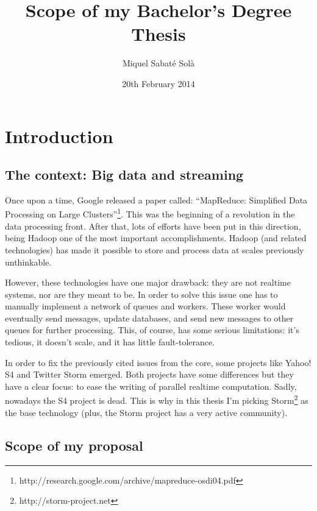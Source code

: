 \documentclass[a4paper,12pt]{article}
\begin{document}
\title{Scope of my Bachelor's Degree Thesis}
\author{Miquel Sabaté Solà}
\date{20th February 2014}
\maketitle

\setcounter{page}{1}

\vspace{-1.0cm}

\section*{Introduction}

\subsection*{The context: Big data and streaming}

Once upon a time, Google released a paper called:
``MapReduce: Simplified Data Processing on Large
Clusters''\footnote{http://research.google.com/archive/mapreduce-osdi04.pdf}.
This was the beginning of a revolution in the data processing front. After
that, lots of efforts have been put in this direction, being Hadoop one of the
most important accomplishments. Hadoop (and related technologies) has made it
possible to store and process data at scales previously unthinkable.

However, these technologies have one major drawback: they are not realtime
systems, nor are they meant to be. In order to solve this issue one has to
manually implement a network of queues and workers. These worker would
eventually send messages, update databases, and send new messages to other
queues for further processing. This, of course, has some serious limitations:
it's tedious, it doesn't scale, and it has little fault-tolerance.

In order to fix the previously cited issues from the core, some projects like
Yahoo! S4 and Twitter Storm emerged. Both projects have some differences but
they have a clear focus: to ease the writing of parallel realtime computation.
Sadly, nowadays the S4 project is dead. This is why in this thesis I'm picking
Storm\footnote{http://storm-project.net} as the base technology (plus, the Storm
project has a very active community).

\subsection*{Scope of my proposal}
\end{document}
